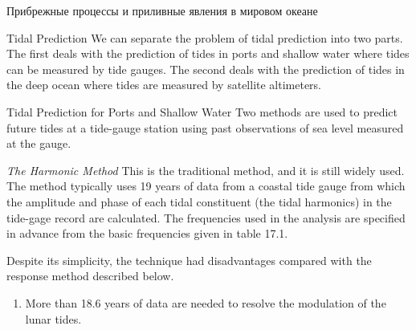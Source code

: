 \begin{chapter}{Прибрежные процессы и приливные явления в мировом океане}
\begin{section}{Tidal Prediction}
We can separate the problem of tidal prediction into two parts. The
first deals with the prediction of tides in ports and shallow water
where tides can be measured by tide gauges. The second deals with the
prediction of tides in the deep ocean where tides are measured by
satellite altimeters.
%

\begin{paragraph}{Tidal Prediction for Ports and Shallow Water}
Two methods are used to predict
future tides at a tide-gauge station using past observations of sea
level measured at the gauge.
%

\textit{The Harmonic Method} This is the traditional method, and it is
still widely used. The
method typically uses 19 years of data from a coastal tide gauge from
which the amplitude and phase of each tidal constituent (the tidal
harmonics) in the tide-gage record are calculated. The frequencies
used in the analysis are specified in advance from the basic
frequencies given in table 17.1.
%

Despite its simplicity, the technique had disadvantages compared with
the response method described below.
%
\begin{enumerate}
\item 
More than 18.6 years of data are needed to resolve the
modulation of the lunar tides.
%


\end{enumerate}
\end{paragraph}
\end{section}
\end{chapter}
